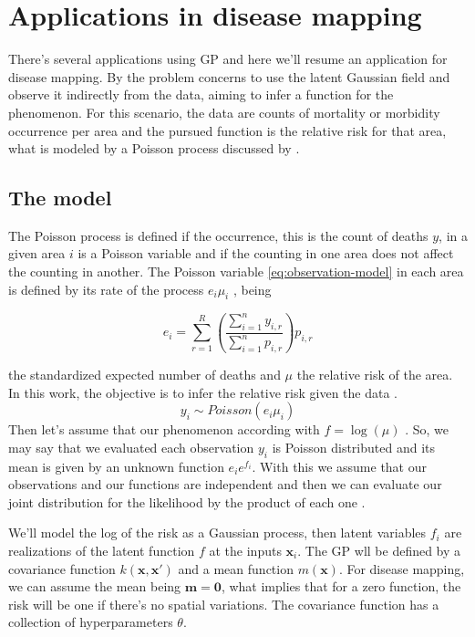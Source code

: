 \section{Applications in disease mapping}
There's several applications using GP and here we'll resume an application for disease mapping. By \cite{Vanhatalo2010Vehtari} the problem concerns to use the latent Gaussian field and observe it indirectly from the data, aiming to infer a function for the phenomenon. For this scenario, the data are counts of mortality or morbidity occurrence per area and the pursued function is the relative risk for that area, what is modeled by a Poisson process discussed by \cite{Best2005}.

\subsection{The model}

The Poisson process is defined if the occurrence, this is the count of deaths $y$, in a given area $i$ is a Poisson variable and if the counting in one area does not affect the counting in another. The Poisson variable \ref{eq:observation-model} in each area is defined by its rate of the process $e_i\mu_i$ \cite{Best2005,Samat2012}, being 

\begin{equation}
    e_{i}=\sum_{r=1}^{R}\left(\frac{\sum_{i=1}^{n} y_{i, r}}{\sum_{i=1}^{n} p_{i, r}}\right) p_{i, r}
\end{equation}

the standardized expected number of deaths and $\mu$ the relative risk of the area. In this work, the objective is to infer the relative risk given the data \cite{lawson2013statistical}. 
%
\begin{equation}
    y_i \sim Poisson(e_i\mu_i)
    \label{eq:observation-model}
\end{equation}
%
Then let's assume that our phenomenon according with $f=\log (\mu)$ \cite{Best2005}. So, we may say that we evaluated each observation $y_i$ is Poisson distributed and its mean is given by an unknown function $e_i e^{f_i}$. With this we assume that our observations and our functions are independent and then we can evaluate our joint distribution for the likelihood by the product of each one \cite{jarno2010}.

We'll model the log of the risk as a Gaussian process, then latent variables $f_i$ are realizations of the latent function $f$ at the inputs $\mathbf{x}_i$. The GP wll be defined by a covariance function $k(\mathbf{x},\mathbf{x}')$ and a mean function $m(\mathbf{x})$. For disease mapping, we can assume the mean being $\mathbf{m}=\mathbf{0}$, what implies that for a zero function, the risk will be one if there's no spatial variations. The covariance function has a collection of hyperparameters $\theta$.


